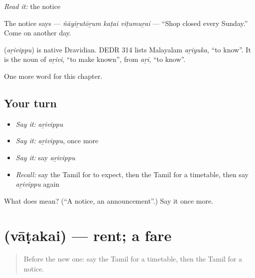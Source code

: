 \emph{Read it:} the notice

The notice says \textbf{  } — \emph{ñāyiṟutōṟum kaṭai viṭumuṟai} — \textquotedblleft{}Shop closed every Sunday.\textquotedblright{} Come on another day.

\begin{cousinweb}
\textbf{} (\emph{aṟivippu}) is native Dravidian. DEDR 314 lists Malayalam \emph{aṟiyuka}, \textquotedblleft{}to know\textquotedblright{}. It is the noun of \emph{aṟivi}, \textquotedblleft{}to make known\textquotedblright{}, from \emph{aṟi}, \textquotedblleft{}to know\textquotedblright{}.
\end{cousinweb}

\begin{grammarlens}[title={What you've built}]
One more word for this chapter.
\end{grammarlens}

\subsection*{Your turn}
\begin{itemize}
\raggedright
  \item \emph{Say it:} \emph{aṟivippu}
  \item \emph{Say it:} \emph{aṟivippu}, once more
  \item \emph{Say it:} say \emph{aṟivippu}
  \item \emph{Recall:} say the Tamil for to expect, then the Tamil for a timetable, then say \emph{aṟivippu} again
\end{itemize}

\begin{tcolorbox}[breakable,colback=teal!4,colframe=teal!35!black,title={Before you move on}]
What does  mean? (\textquotedblleft{}A notice, an announcement\textquotedblright{}.) Say it once more.
\end{tcolorbox}
\section[\texorpdfstring{\ta{வாடகை} (vāṭakai)}{வாடகை (vāṭakai)}]{ (vāṭakai) — rent; a fare}

\label{lesson:TA-C160-vatakai}



\begin{quote}
Before the new one: say the Tamil for a timetable, then the Tamil for a notice.
\end{quote}

